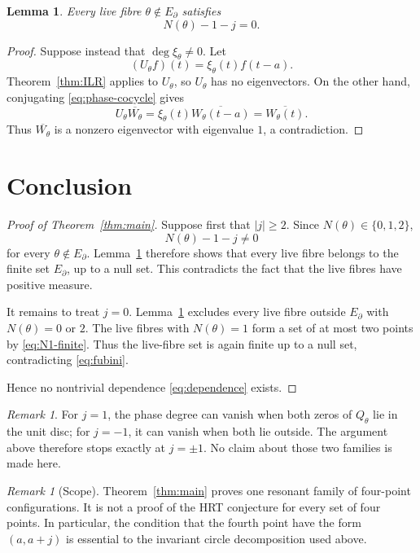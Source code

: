 \documentclass[11pt]{amsart}
\newtheorem{lemma}[theorem]{Lemma}
\theoremstyle{remark}
\newtheorem{remark}[theorem]{Remark}
\begin{document}
\begin{lemma}\label{lem:degree-kill}
Every live fibre $\theta\notin E_\partial$ satisfies
\[
 N(\theta)-1-j=0.
\]
\end{lemma}

\begin{proof}
Suppose instead that $\deg\xi_\theta\ne0$. Let
\[
 (U_\theta f)(t)=\xi_\theta(t)f(t-a).
\]
Theorem~\ref{thm:ILR} applies to $U_\theta$, so $U_\theta$ has no eigenvectors. On the
other hand, conjugating \eqref{eq:phase-cocycle} gives
\[
 U_\theta\overline{W_\theta}
 =\xi_\theta(t)\overline{W_\theta(t-a)}
 =\overline{W_\theta(t)}.
\]
Thus $\overline{W_\theta}$ is a nonzero eigenvector with eigenvalue $1$, a contradiction.
\end{proof}

\section{Conclusion}

\begin{proof}[Proof of Theorem~\ref{thm:main}]
Suppose first that $|j|\ge2$. Since $N(\theta)\in\{0,1,2\}$,
\[
 N(\theta)-1-j\ne0
\]
for every $\theta\notin E_\partial$. Lemma~\ref{lem:degree-kill} therefore shows that
every live fibre belongs to the finite set $E_\partial$, up to a null set. This
contradicts the fact that the live fibres have positive measure.

It remains to treat $j=0$. Lemma~\ref{lem:degree-kill} excludes every live fibre
outside $E_\partial$ with $N(\theta)=0$ or $2$. The live fibres with $N(\theta)=1$
form a set of at most two points by \eqref{eq:N1-finite}. Thus the live-fibre set is
again finite up to a null set, contradicting \eqref{eq:fubini}.

Hence no nontrivial dependence \eqref{eq:dependence} exists.
\end{proof}

\begin{remark}
For $j=1$, the phase degree can vanish when both zeros of $Q_\theta$ lie in the unit
disc; for $j=-1$, it can vanish when both lie outside. The argument above therefore
stops exactly at $j=\pm1$. No claim about those two families is made here.
\end{remark}

\begin{remark}[Scope]
Theorem~\ref{thm:main} proves one resonant family of four-point configurations. It is
not a proof of the HRT conjecture for every set of four points. In particular, the
condition that the fourth point have the form $(a,a+j)$ is essential to the invariant
circle decomposition used above.
\end{remark}
\end{document}
